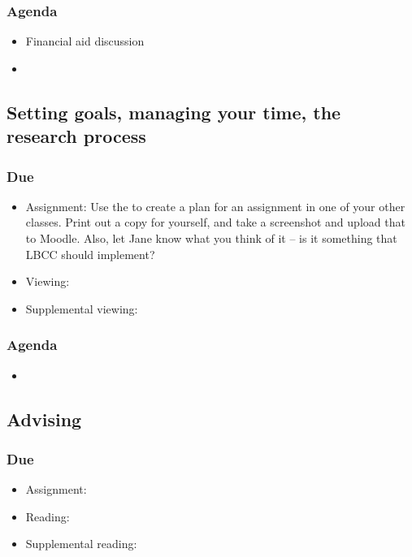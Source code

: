\documentclass[12pt,article,oneside]{memoir}
\begin{document}
\subsubsection{Agenda}
\begin{itemize}
\item Financial aid discussion
\item 
\end{itemize}



\subsection{Setting goals, managing your time, the research process}
\subsubsection{Due}
\begin{itemize}
 \item Assignment: Use the  to create a plan for an assignment in one of your other classes.  Print out a copy for yourself, and take a screenshot and upload that to Moodle.  Also, let Jane know what you think of it -- is it something that LBCC should implement?
 \item Viewing: \cite{decipher}
 \item Supplemental viewing: \cite{incorporating}
\end{itemize}

\subsubsection{Agenda}
\begin{itemize}
\item 
\end{itemize}

\subsection{Advising}
\subsubsection{Due}
\begin{itemize}
 \item Assignment: 
 \item Reading:
 \item Supplemental reading:
\end{itemize}
\end{document}
